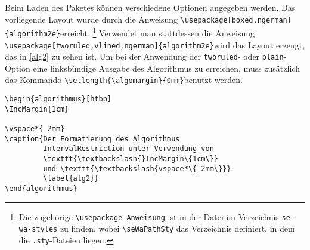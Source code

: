 Beim Laden des Paketes k\"onnen verschiedene Optionen angegeben werden. Das vorliegende Layout wurde 
durch die Anweisung \newline\hspace*{\fill}\verb+\usepackage[boxed,ngerman]{algorithm2e}+\hspace*{\fill}\newline erreicht.%
\footnote{Die zugeh\"orige \texttt{\textbackslash{}usepackage-Anweisung} ist in der Datei \waInputStyles{} im 
Verzeichnis  \texttt{se-wa-styles} zu finden, wobei \texttt{\textbackslash{}seWaPathSty} das Verzeichnis definiert, in dem die 
\texttt{.sty}-Dateien liegen.} Verwendet man stattdessen die Anweisung 
\newline\hspace*{\fill}\verb+\usepackage[tworuled,vlined,ngerman]{algorithm2e}+\hspace*{\fill}\newline wird das Layout erzeugt, 
das in \vref{alg2} zu sehen ist. Um bei der Anwendung der \verb+tworuled+- oder \verb+plain+-Option eine linksb\"undige Ausgabe des 
Algorithmus zu erreichen, muss zus\"atzlich das Kommando \newline\hspace*{\fill}\verb+\setlength{\algomargin}{0mm}+\hspace*{\fill}\newline benutzt werden.

\begin{programm}[htbp]
\begin{lstlisting}[keywordstyle=\color{black}]
\begin{algorithmus}[htbp]
\IncMargin{1cm}

\vspace*{-2mm}
\caption{Der Formatierung des Algorithmus 
         IntervalRestriction unter Verwendung von 
         \texttt{\textbackslash{}IncMargin\{1cm\}} 
         und \texttt{\textbackslash{vspace*\{-2mm\}}}
         \label{alg2}}
\end{algorithmus}
\end{lstlisting}
\caption{Quelltext zur Spezifikation des \vref{alg2}\label{alg2-quelltext}}
\end{programm}



\SetAlgoVlined{}

